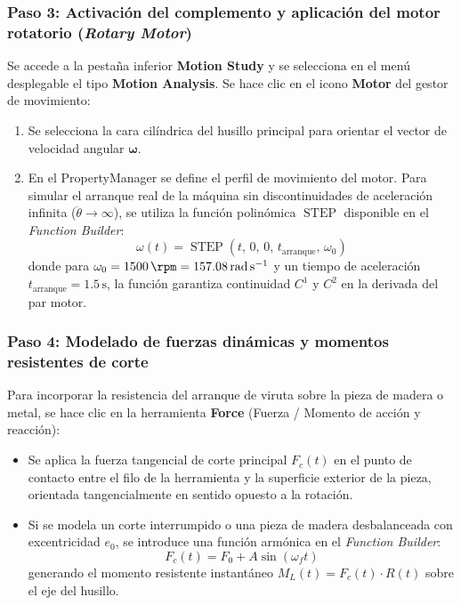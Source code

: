 \documentclass[12pt,a4paper]{article}
\begin{document}
\subsubsection{Paso 3: Activación del complemento y aplicación del motor rotatorio (\textit{Rotary Motor})}
Se accede a la pestaña inferior \textbf{Motion Study} y se selecciona en el menú desplegable el tipo \textbf{Motion Analysis}. Se hace clic en el icono \textbf{Motor} del gestor de movimiento:
\begin{enumerate}[itemsep=2pt, topsep=2pt, parsep=0pt]
    \item Se selecciona la cara cilíndrica del husillo principal para orientar el vector de velocidad angular $\boldsymbol{\omega}$.
    \item En el PropertyManager se define el perfil de movimiento del motor. Para simular el arranque real de la máquina sin discontinuidades de aceleración infinita ($\ddot{\theta} \to \infty$), se utiliza la función polinómica $\operatorname{STEP}$ disponible en el \textit{Function Builder}:
    \begin{equation}
        \omega(t) = \operatorname{STEP}(t, \, 0, \, 0, \, t_{\text{arranque}}, \, \omega_0)
        \label{eq:funcion_step_motor}
    \end{equation}
    donde para $\omega_0 = 1500\,\si{\rpm} = 157.08\,\si{\radian\per\second}$ y un tiempo de aceleración $t_{\text{arranque}} = 1.5\,\si{\second}$, la función garantiza continuidad $C^1$ y $C^2$ en la derivada del par motor.
\end{enumerate}

\subsubsection{Paso 4: Modelado de fuerzas dinámicas y momentos resistentes de corte}
Para incorporar la resistencia del arranque de viruta sobre la pieza de madera o metal, se hace clic en la herramienta \textbf{Force} (Fuerza / Momento de acción y reacción):
\begin{itemize}[itemsep=2pt, topsep=2pt, parsep=0pt]
    \item Se aplica la fuerza tangencial de corte principal $F_c(t)$ en el punto de contacto entre el filo de la herramienta y la superficie exterior de la pieza, orientada tangencialmente en sentido opuesto a la rotación.
    \item Si se modela un corte interrumpido o una pieza de madera desbalanceada con excentricidad $e_0$, se introduce una función armónica en el \textit{Function Builder}:
    \begin{equation}
        F_c(t) = F_0 + A \sin(\omega_f t)
        \label{eq:fuerza_sw_armonica}
    \end{equation}
    generando el momento resistente instantáneo $M_L(t) = F_c(t) \cdot R(t)$ sobre el eje del husillo.
\end{itemize}
\end{document}
